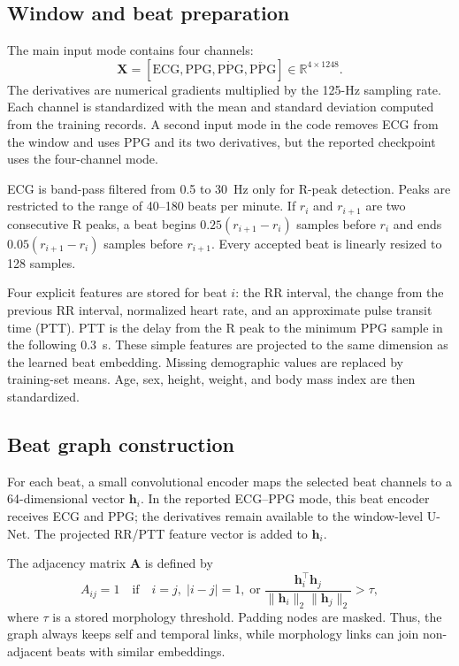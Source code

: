 \documentclass[journal,twoside,web]{ieeecolor}
\begin{document}
\subsection{Window and beat preparation}

The main input mode contains four channels:
\begin{equation}
\mathbf{X}=[\mathrm{ECG},\mathrm{PPG},\dot{\mathrm{PPG}},\ddot{\mathrm{PPG}}]\in\mathbb{R}^{4\times1248}.
\label{eq:input}
\end{equation}
The derivatives are numerical gradients multiplied by the 125-Hz sampling rate. Each channel is standardized with the mean and standard deviation computed from the training records. A second input mode in the code removes ECG from the window and uses PPG and its two derivatives, but the reported checkpoint uses the four-channel mode.

ECG is band-pass filtered from 0.5 to 30~Hz only for R-peak detection. Peaks are restricted to the range of 40--180 beats per minute. If $r_i$ and $r_{i+1}$ are two consecutive R peaks, a beat begins $0.25(r_{i+1}-r_i)$ samples before $r_i$ and ends $0.05(r_{i+1}-r_i)$ samples before $r_{i+1}$. Every accepted beat is linearly resized to 128 samples.

Four explicit features are stored for beat $i$: the RR interval, the change from the previous RR interval, normalized heart rate, and an approximate pulse transit time (PTT). PTT is the delay from the R peak to the minimum PPG sample in the following 0.3~s. These simple features are projected to the same dimension as the learned beat embedding. Missing demographic values are replaced by training-set means. Age, sex, height, weight, and body mass index are then standardized.

\subsection{Beat graph construction}

For each beat, a small convolutional encoder maps the selected beat channels to a 64-dimensional vector $\mathbf{h}_i$. In the reported ECG--PPG mode, this beat encoder receives ECG and PPG; the derivatives remain available to the window-level U-Net. The projected RR/PTT feature vector is added to $\mathbf{h}_i$.

The adjacency matrix $\mathbf{A}$ is defined by
\begin{equation}
A_{ij}=1 \quad \text{if}\quad i=j,\; |i-j|=1,\;\text{or}\;
\frac{\mathbf{h}_i^\top\mathbf{h}_j}{\|\mathbf{h}_i\|_2\|\mathbf{h}_j\|_2}>\tau,
\label{eq:adjacency}
\end{equation}
where $\tau$ is a stored morphology threshold. Padding nodes are masked. Thus, the graph always keeps self and temporal links, while morphology links can join non-adjacent beats with similar embeddings.
\end{document}
